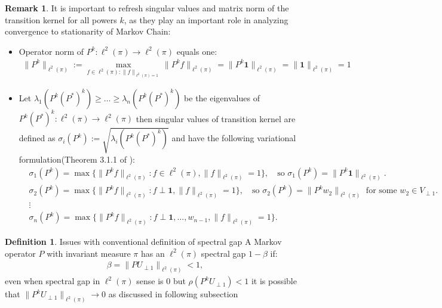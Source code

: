 \documentclass[preprint]{imsart}
\theoremstyle{plain}
\theoremstyle{definition}
\newtheorem{definition}[theorem]{Definition}
\newtheorem{remark}{Remark}
\begin{document}
\begin{remark}
\label{rmk: sing_and_mat_norms}
It is important to refresh singular values and matrix norm of the transition kernel for all powers $k$, as they play an important role in analyzing convergence to stationarity of Markov Chain:  
    \begin{itemize}
        \item Operator norm of $P^{k}:\ell^{2}      (\pi)\rightarrow \ell^{2}(\pi)$ equals one:
            \begin{align}
            \label{eq:P_op_norm_one_ell_2}
            \|P^{k}\|_{\ell^{2}(\pi)}:=\max_{f\in \ell^{2}(\pi):\|f\|_{\ell^{2}(\pi)=1}}\|P^{k}f\|_{\ell^{2}(\pi)}=\|P^{k}\mathbf{1}\|_{\ell^{2}(\pi)}=\|\mathbf{1}\|_{\ell^{2}(\pi)}=1
            \end{align}
        \item Let $\lambda_{1}(P^{k}(P^{*})^{k})\geq \ldots \geq \lambda_{n}(P^{k}(P^{*})^{k})$ be the eigenvalues of $P^{k}(P^{*})^{k}:\ell^{2}(\pi)\rightarrow \ell^{2}(\pi)$ then singular values of transition kernel are defined as $\sigma_{i}(P^{k}):=\sqrt{\lambda_{i}(P^{k}(P^{*})^{k})}$ and have the following variational formulation(Theorem 3.1.1 of \cite{horn1994topics}):
            \begin{align}
            &\sigma_1(P^{k}) = \label{eq:sig_1_at_1} \max \{ \|P^{k}f\|_{\ell^{2}(\pi)} : f \in \ell^{2}(\pi), \|f\|_{\ell^{2}(\pi)} = 1 \}, \quad 
            \text{so } \sigma_1(P^{k}) = \|P^{k}\mathbf{1}\|_{\ell^{2}(\pi)}. \\    
            & \label{eq:sig_2_orth_1_sup} \sigma_2(P^{k}) = \max \{ \|P^{k}f\|_{\ell^{2}(\pi)} : f \perp \mathbf{1}, \|f\|_{\ell^{2}(\pi)} = 1 \}, \quad 
            \text{so } \sigma_2(P^{k}) = \|P^{k} w_2\|_{\ell^{2}(\pi)}
            \text{ for some } w_2 \in V_{\perp 1}. \\ & \nonumber \vdots \\  & \label{eq:sig_n_P_perp} \sigma_n(P^{k}) = \max \{ \|P^{k}f\|_{\ell^{2}(\pi)} : f \perp \mathbf{1}, \ldots, w_{n-1}, \|f\|_{\ell^{2}(\pi)} = 1\}.
            \end{align}        
    \end{itemize}
\end{remark}
\begin{definition}
Issues with conventional definition of spectral gap \cite{hairer2014spectral} A Markov operator $P$ with invariant measure $\pi$ has an $\ell^{2}(\pi)$ spectral gap $1-\beta$ if:
\begin{align}
\label{eq:ell_2}
\beta=\|PU_{\perp 1}\|_{\ell^{2}(\pi)}<1,   
\end{align}
even when spectral gap in $\ell^{2}(\pi)$ sense is $0$ but $\rho(P^{k}U_{\perp 1})<1$ it is possible that $\|P^{k}U_{\perp 1}\|_{\ell^{2}(\pi)} \rightarrow 0$ as discussed in following subsection  
\end{definition}
\end{document}
